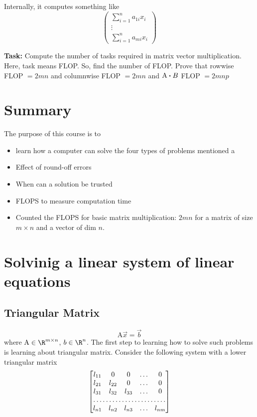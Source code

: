 \documentclass[a4paper]{article}
\begin{document}
Internally, it computes something like
\begin{equation}
	\begin{pmatrix} \sum_{i=1}^{n} a_{1i}x_i\\ \vdots\\ \sum_{i=1}^{n} a_{mi}x_i \end{pmatrix}
\end{equation}

\textbf{Task:} Compute the number of tasks required in matrix vector
multiplication. Here, task means FLOP. So, find the number of FLOP.
Prove that rowwise FLOP $= 2mn$ and columnwise FLOP $= 2mn$ and 
$\mathrm{A}\vdot B$ FLOP $= 2mnp$

\section*{Summary}
The purpose of this course is to 
\begin{itemize}
	\item learn how a computer can solve
the four types of problems mentioned a
	\item Effect of round-off errors 
	\item When can a solution be trusted
	\item FLOPS to measure computation time
	\item Counted the FLOPS for basic matrix multiplication: $2mn$ for a matrix of size $m\times n$ and a vector of dim $n$.
\end{itemize}

\section*{Solvinig a linear system of linear equations}
\subsection*{Triangular Matrix}
\begin{equation}
	\mathrm{A}\vec{x} = \vec{b}
\end{equation}
where $\mathrm A \in \R^{m \times  n}$, $b \in  \R^{n}$. The first
step to learning how to solve such problems is learning about
triangular matrix. Consider the following system with a lower
triangular matrix
\begin{equation}
	\begin{bmatrix} l_{11} & 0 & 0 & \ldots & 0\\
		l_{21} & l_{22} & 0 & \ldots & 0 \\
		l_{31} & l_{32} & l_{33} & \ldots & 0\\
	\hdotsfor{5} \\  
	l_{n 1} & l_{n 2} & l_{n 3} &\ldots & l_{nm} \end{bmatrix}
\end{equation}
\end{document}

